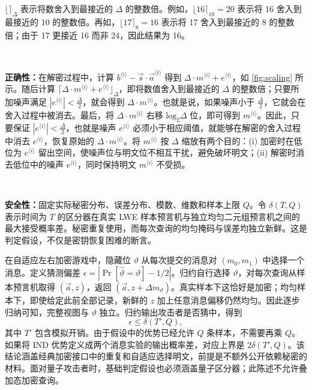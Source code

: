 $\lfloor \rceil_\Delta$ 表示将数舍入到最接近的 $\Delta$ 的整数倍。例如，$\lfloor 16 \rceil_{10} = 20$ 表示将 16 舍入到最接近的 10 的整数倍。再如，$\lfloor 17 \rceil_{8} = 16$ 表示将 17 舍入到最接近的 8 的整数倍；由于 17 更接近 16 而非 24，因此结果为 16。


$ $

\noindent \textbf{正确性：}在解密过程中，计算 $b^{\langle i \rangle} - \vec{s} \cdot \vec{a}^{\langle i \rangle}$ 得到 $\Delta \cdot m^{\langle i \rangle}+ e^{\langle i \rangle}$，如 \autoref{fig:scaling} 所示。随后计算 $\lceil \Delta \cdot m^{\langle i \rangle} + e^{\langle i \rangle} \rfloor_{\Delta}$，即将数值舍入到最接近的 $\Delta$ 的整数倍；只要所加噪声满足 $|e^{\langle i \rangle}| < \frac{\Delta}{2}$，就会得到 $\Delta \cdot m^{\langle i \rangle}$。也就是说，如果噪声小于 $\frac{\Delta}{2}$，它就会在舍入过程中被消去。最后，将 $\Delta \cdot m^{\langle i \rangle}$ 右移 $\text{log}_2 \Delta$ 位，即可得到 $m^{\langle i \rangle}$。因此，只要保证 $|e^{\langle i \rangle}| < \frac{\Delta}{2}$，也就是噪声 $e^{\langle i \rangle}$ 必须小于相应阈值，就能够在解密的舍入过程中消去 $e^{\langle i \rangle}$，恢复原始的 $\Delta \cdot m^{\langle i \rangle}$。将 $m^{\langle i \rangle}$ 按 $\Delta$ 缩放有两个目的：(i) 加密时在低位为 $e^{\langle i \rangle}$ 留出空间，使噪声位与明文位不相互干扰，避免破坏明文；(ii) 解密时消去低位中的噪声 $e^{\langle i \rangle}$，同时保持明文 $m^{\langle i \rangle}$ 不受损。

$ $

\noindent \textbf{安全性：}固定实际秘密分布、误差分布、模数、维数和样本上限 $Q$。令 $\delta(T,Q)$ 表示时间为 $T$ 的区分器在真实 LWE 样本预言机与独立均匀二元组预言机之间的最大接受概率差。秘密重复使用，而每次查询的均匀掩码与误差均独立新鲜。这是判定假设，不仅是密钥恢复困难的断言。

在自适应左右加密游戏中，隐藏位 $\vartheta$ 从每次提交的消息对 $(m_0,m_1)$ 中选择一个消息。定义猜测偏差 $\epsilon=|\Pr[\widehat\vartheta=\vartheta]-1/2|$。归约自行选择 $\vartheta$，对每次查询从样本预言机取得 $(\vec a,z)$，返回 $(\vec a,z+\Delta m_\vartheta)$。真实样本下这恰好是加密；均匀样本下，即使给定此前全部记录，新鲜的 $z$ 加上任意消息偏移仍然均匀。因此逐步归纳可知，完整视图与 $\vartheta$ 独立。归约输出攻击者是否猜中，得到
\[
\epsilon\le\delta(T',Q),
\]
其中 $T'$ 包含模拟开销。由于假设中的优势已经允许 $Q$ 条样本，不需要再乘 $Q$。如果将 IND 优势定义成两个消息实验的输出概率差，对应上界是 $2\delta(T',Q)$。该结论涵盖经典加密接口中的重复和自适应选择明文，前提是不额外公开依赖秘密的材料。面对量子攻击者时，基础判定假设也必须涵盖量子区分器；此陈述不允许叠加态加密查询。

